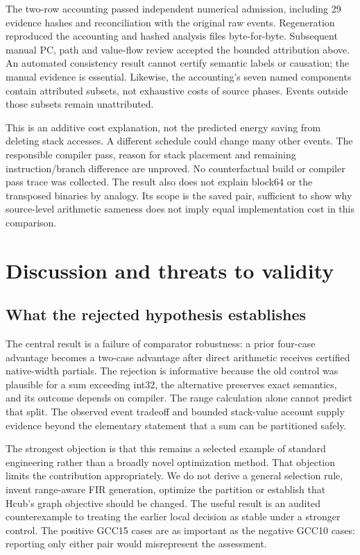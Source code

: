\documentclass[conference]{IEEEtran}
\begin{document}
The two-row accounting passed independent numerical admission, including
29 evidence hashes and reconciliation with the original raw events.
Regeneration reproduced the accounting and hashed analysis files
byte-for-byte. Subsequent manual PC, path and value-flow review accepted
the bounded attribution above. An automated consistency result cannot
certify semantic labels or causation; the manual evidence is essential.
Likewise, the accounting's seven named components contain attributed
subsets, not exhaustive costs of source phases. Events outside those
subsets remain unattributed.

This is an additive cost explanation, not the predicted energy saving
from deleting stack accesses. A different schedule could change many
other events. The responsible compiler pass, reason for stack placement
and remaining instruction/branch difference are unproved. No
counterfactual build or compiler pass trace was collected. The result
also does not explain block64 or the transposed binaries by analogy. Its
scope is the saved pair, sufficient to show why source-level arithmetic
sameness does not imply equal implementation cost in this comparison.

\section{Discussion and threats to validity}\label{discussion-and-threats-to-validity}

\subsection{What the rejected hypothesis establishes}\label{what-the-rejected-hypothesis-establishes}

The central result is a failure of comparator robustness: a prior
four-case advantage becomes a two-case advantage after direct arithmetic
receives certified native-width partials. The rejection is informative
because the old control was plausible for a sum exceeding int32, the
alternative preserves exact semantics, and its outcome depends on
compiler. The range calculation alone cannot predict that split. The
observed event tradeoff and bounded stack-value account supply evidence
beyond the elementary statement that a sum can be partitioned safely.

The strongest objection is that this remains a selected example of
standard engineering rather than a broadly novel optimization method.
That objection limits the contribution appropriately. We do not derive a
general selection rule, invent range-aware FIR generation, optimize the
partition or establish that Hcub's graph objective should be changed.
The useful result is an audited counterexample to treating the earlier
local decision as stable under a stronger control. The positive GCC15
cases are as important as the negative GCC10 cases: reporting only
either pair would misrepresent the assessment.
\end{document}
